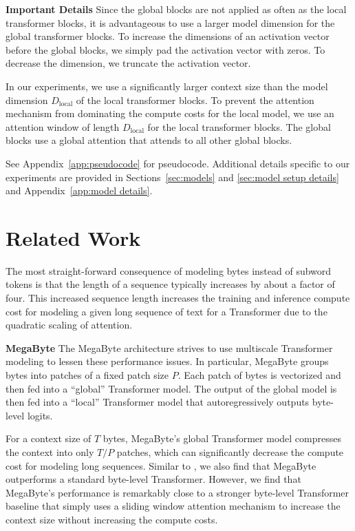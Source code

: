 \newcommand{\patchExample}[1]{\texttt{#1}}
\newcommand{\SB}[1]{{\color{blue}\underline{#1}}} 
\newcommand{\textdownarrow}{\textdownarrow}

\textbf{Important Details} Since the global blocks are not applied as often as the local transformer blocks, it is advantageous to use a larger model dimension for the global transformer blocks. To increase the dimensions of an activation vector before the global blocks, we simply pad the activation vector with zeros. To decrease the dimension, we truncate the activation vector.

In our experiments, we use a significantly larger context size than the model dimension $D_\text{local}$ of the local transformer blocks. To prevent the attention mechanism from dominating the compute costs for the local model, we use an attention window \cite{longformer2020,child2019sparse,press2021shortformer} of length $D_\text{local}$ for the local transformer blocks. The global blocks use a global attention that attends to all other global blocks.

See Appendix~\ref{app:pseudocode} for pseudocode. Additional details specific to our experiments are provided in Sections~\ref{sec:models} and \ref{sec:model setup details} and Appendix~\ref{app:model details}.

\section{Related Work}

The most straight-forward consequence of modeling bytes instead of subword tokens is that the length of a sequence typically increases by about a factor of four. This increased sequence length increases the training and inference compute cost for modeling a given long sequence of text for a Transformer due to the quadratic scaling of attention.

\textbf{MegaByte}
The MegaByte architecture strives to use multiscale Transformer modeling to lessen these performance issues. In particular, MegaByte groups bytes into patches of a fixed patch size $P$. Each patch of bytes is vectorized and then fed into a ``global'' Transformer model. The output of the global model is then fed into a ``local'' Transformer model that autoregressively outputs byte-level logits. \cite{megabyte}

For a context size of $T$ bytes, MegaByte's global Transformer model compresses the context into only $T/P$ patches, which can significantly decrease the compute cost for modeling long sequences. Similar to \citet{megabyte},
  we also find that MegaByte outperforms a standard byte-level Transformer. However, we find that MegaByte's performance is remarkably close to a stronger byte-level Transformer baseline that simply uses a sliding window attention mechanism \cite{longformer2020,child2019sparse,press2021shortformer} to increase the context size without increasing the compute costs.

